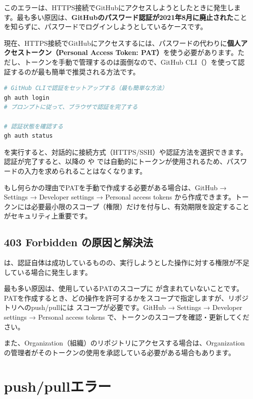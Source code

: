 このエラーは、HTTPS接続でGitHubにアクセスしようとしたときに発生します。最も多い原因は、\textbf{GitHubのパスワード認証が2021年8月に廃止された}ことを知らずに、パスワードでログインしようとしているケースです。

現在、HTTPS接続でGitHubにアクセスするには、パスワードの代わりに\textbf{個人アクセストークン（Personal Access Token: PAT）}を使う必要があります。ただし、トークンを手動で管理するのは面倒なので、GitHub CLI（）を使って認証するのが最も簡単で推奨される方法です。

\begin{lstlisting}[language=bash]
# GitHub CLIで認証をセットアップする（最も簡単な方法）
gh auth login
# プロンプトに従って、ブラウザで認証を完了する

# 認証状態を確認する
gh auth status
\end{lstlisting}

 を実行すると、対話的に接続方式（HTTPS/SSH）や認証方法を選択できます。認証が完了すると、以降の  や  では自動的にトークンが使用されるため、パスワードの入力を求められることはなくなります。

もし何らかの理由でPATを手動で作成する必要がある場合は、GitHub → Settings → Developer settings → Personal access tokens から作成できます。トークンには必要最小限のスコープ（権限）だけを付与し、有効期限を設定することがセキュリティ上重要です。

\subsection{403 Forbidden の原因と解決法}

 は、認証自体は成功しているものの、実行しようとした操作に対する権限が不足している場合に発生します。

最も多い原因は、使用しているPATのスコープに  が含まれていないことです。PATを作成するとき、どの操作を許可するかをスコープで指定しますが、リポジトリへのpush/pullには  スコープが必要です。GitHub → Settings → Developer settings → Personal access tokens で、トークンのスコープを確認・更新してください。

また、Organization（組織）のリポジトリにアクセスする場合は、Organizationの管理者がそのトークンの使用を承認している必要がある場合もあります。

\section{push/pullエラー}

